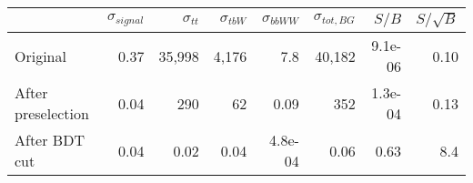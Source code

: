 \begin{tabular}{lrrrrrrr}
\toprule
{} &  $\sigma_{signal}$ &  $\sigma_{tt}$ &  $\sigma_{tbW}$ &  $\sigma_{bbWW}$ &  $\sigma_{tot,BG}$ &   $S/B$ &  $S/\sqrt{B}$ \\
\midrule
Original           &               0.37 &          35,998 &           4,176 &              7.8 &             40,182 & 9.1e-06 &          0.10 \\
After preselection &               0.04 &             290 &              62 &             0.09 &                352 & 1.3e-04 &          0.13 \\
After BDT cut      &               0.04 &            0.02 &            0.04 &          4.8e-04 &               0.06 &    0.63 &           8.4 \\
\bottomrule
\end{tabular}
